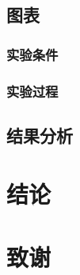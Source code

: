 \documentclass{ctexbook}
\begin{document}
    \subsection{图表}
    \subsubsection{实验条件} %
    \subsubsection{实验过程}
    \subsection{结果分析}
    \section{结论}
    \section{致谢}
\end{document}
